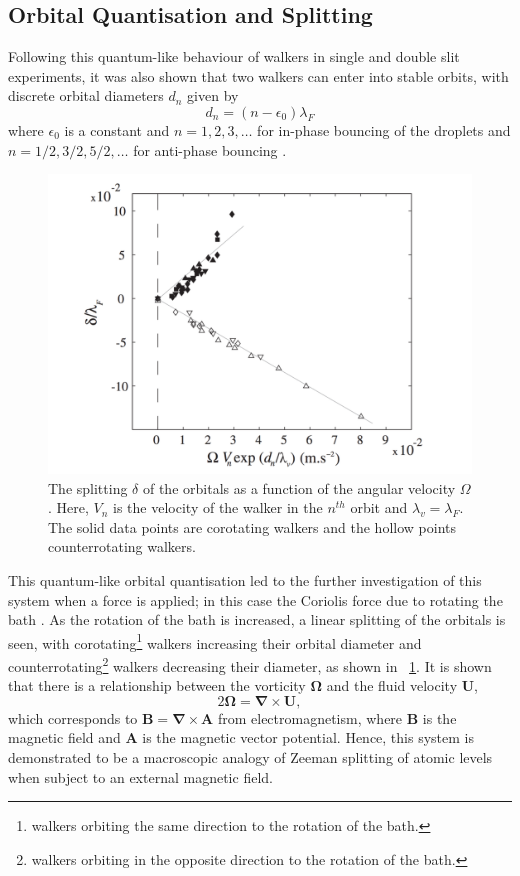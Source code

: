 \documentclass[11pt]{article}
\newcommand{\figref}[2][\figurename~]{#1\ref{#2}}
\begin{document}
\subsection{Orbital Quantisation and Splitting}
\label{sec:orbitalquantisationandsplitting}
Following this quantum-like behaviour of walkers in single and double slit experiments, it was also shown that two walkers can enter into stable orbits, with discrete orbital diameters $d_n$ given by
\begin{equation}
    \label{orbit}
    d_n=(n-\epsilon_0)\lambda_F
\end{equation}
where $\epsilon_0$ is a constant and $n=1,2,3,\ldots$ for in-phase bouncing of the droplets and $n=1/2,3/2,5/2,\ldots$ for anti-phase bouncing \cite{5,9,6}.

\begin{figure}[h]
    \centering
    \includegraphics[width=0.65\columnwidth]{LevelSplitting.pdf}
    \caption{The splitting $\delta$ of the orbitals as a function of the angular velocity $\Omega$.  Here, $V_n$ is the velocity of the walker in the $n^{th}$ orbit and $\lambda_v=\lambda_F$.  The solid data points are corotating walkers and the hollow points counterrotating walkers.}
    \label{fig:levelsplitting}
\end{figure}

This quantum-like orbital quantisation led to the further investigation of this system when a force is applied; in this case the Coriolis force due to rotating the bath \cite{6}.  As the rotation of the bath is increased, a linear splitting of the orbitals is seen, with corotating\footnote{walkers orbiting the same direction to the rotation of the bath.} walkers increasing their orbital diameter and counterrotating\footnote{walkers orbiting in the opposite direction to the rotation of the bath.} walkers decreasing their diameter, as shown in \figref{fig:levelsplitting}.  It is shown that there is a relationship between the vorticity $\bm{\Omega}$ and the fluid velocity $\bm{U}$,
\begin{equation}
    \label{vorticity}
    2\bm{\Omega}=\bm{\nabla}\times\bm{U},
\end{equation}
which corresponds to $\bm{B}=\bm{\nabla}\times\bm{A}$ from electromagnetism, where $\bm{B}$ is the magnetic field and $\bm{A}$ is the magnetic vector potential.  Hence, this system is demonstrated to be a macroscopic analogy of Zeeman splitting of atomic levels when subject to an external magnetic field.
\end{document}
